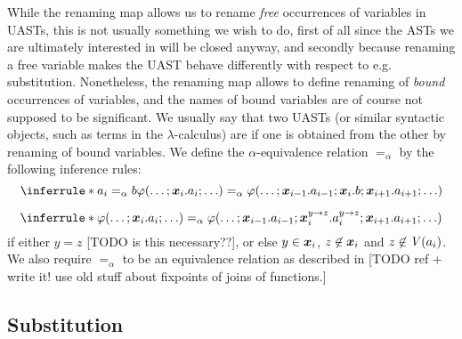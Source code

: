 \documentclass[a4paper, 11pt, article, danish, oneside]{memoir}
\DeclarePairedDelimiter{\auxdelimparen}{(}{)}
\renewcommand{\phi}{\varphi}
\newcommand{\newpar}{\paragraph{}}
\newcommand{\allvar}[2][]{\mathit{V}\auxdelimparen[#1]{#2}}
\begin{document}
While the renaming map allows us to rename \emph{free} occurrences of variables in UASTs, this is not usually something we wish to do, first of all since the ASTs we are ultimately interested in will be closed anyway, and secondly because renaming a free variable makes the UAST behave differently with respect to e.g. substitution. Nonetheless, the renaming map allows to define renaming of \emph{bound} occurrences of variables, and the names of bound variables are of course not supposed to be significant. We usually say that two UASTs (or similar syntactic objects, such as terms in the $\lambda$-calculus) are  if one is obtained from the other by renaming of bound variables. We define the $\alpha$-equivalence relation $=_\alpha$ by the following inference rules:
%
\begin{equation*}
    \inferrule*{
        a_i =_\alpha b
    }{
        \phi(\ldots ; \seq{x}_i.a_i ; \ldots)
            =_\alpha \phi( \ldots ; \seq{x}_{i-1}.a_{i-1} ; \seq{x}_i.b ; \seq{x}_{i+1}.a_{i+1} ; \ldots )
    }
\end{equation*}

\begin{equation*}
    \inferrule*{ }{
        \phi(\ldots ; \seq{x}_i.a_i ; \ldots)
            =_\alpha \phi( \ldots ; \seq{x}_{i-1}.a_{i-1} ; \seq{x}_i^{y \to z}.a_i^{y \to z} ; \seq{x}_{i+1}.a_{i+1} ; \ldots )
    }
\end{equation*}
%
if either $y = z$ [TODO is this necessary??], or else $y \in \bm{x}_i$, $z \not\in \bm{x}_i$ and $z \not\in \allvar{a_i}$. We also require $=_\alpha$ to be an equivalence relation as described in [TODO ref + write it! use old stuff about fixpoints of joins of functions.]


\subsection{Substitution}

\newpar
\end{document}
